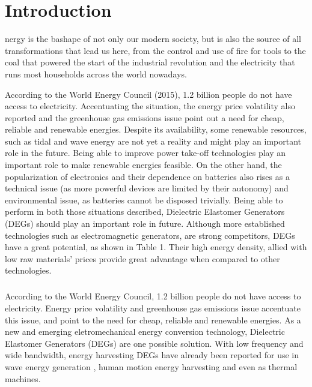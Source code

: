 %
%
\let\textcircled=\pgftextcircled
\chapter{Introduction}
\label{chap:intro}

nergy is the bashape of not only our modern society, but is also the source of all transformations that lead us here, from the control and use of fire for tools to the coal that powered the start of the industrial revolution and  the electricity that runs most households across the world nowadays. 

According to the World Energy Council (2015), 1.2 billion people do not  have access to electricity. Accentuating the situation, the energy price volatility also reported and the greenhouse gas emissions issue point out a need for cheap, reliable and renewable energies.  Despite its availability, some renewable resources, such as tidal and wave energy are not yet a reality and might play an important role in the future. Being able to improve power take-off technologies play an important role to make renewable energies feasible.
On the other hand, the popularization of electronics and their dependence on batteries also rises as a technical issue (as more powerful devices are limited by their autonomy) and environmental issue, as batteries cannot be disposed trivially.
Being able to perform in both those situations described, Dielectric Elastomer Generators (DEGs) should play an important role in future. Although more established technologies such as electromagnetic generators, are strong competitors, DEGs have a great potential, as shown in Table 1. Their high energy density, allied with low raw materials’ prices provide great advantage when compared to other technologies.
\paragraph{} According to the World Energy Council\cite{EnergyIssues}, 1.2 billion people do not have access to electricity. Energy price volatility and greenhouse gas emissions issue accentuate this issue, and point to the need for cheap, reliable and renewable energies.  As a new and emerging eletromechanical energy conversion technology, Dielectric Elastomer Generators (DEGs) are one possible solution. With low frequency and wide bandwidth\cite{Boots2buoys}, energy harvesting DEGs have already been reported for use in wave energy generation \cite{VertechyPolyWECtest2014}, human motion energy harvesting\cite{MistralHMotion2008} and even as thermal machines\cite{Boots2buoys}.
